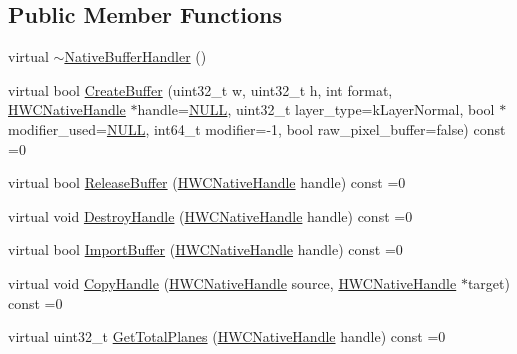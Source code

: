 \subsection*{Public Member Functions}
\begin{DoxyCompactItemize}
\item 
virtual \mbox{\hyperlink{classhwcomposer_1_1NativeBufferHandler_a646333d259ac8d876282312b1dcd599f}{$\sim$\+Native\+Buffer\+Handler}} ()
\item 
virtual bool \mbox{\hyperlink{classhwcomposer_1_1NativeBufferHandler_a7e58e3d81d3f56cbee34c963b4999fde}{Create\+Buffer}} (uint32\+\_\+t w, uint32\+\_\+t h, int format, \mbox{\hyperlink{alios_2platformdefines_8h_ac0a2eaf260f556d17fe489911f017bdf}{H\+W\+C\+Native\+Handle}} $\ast$handle=\mbox{\hyperlink{alios_2platformdefines_8h_a070d2ce7b6bb7e5c05602aa8c308d0c4}{N\+U\+LL}}, uint32\+\_\+t layer\+\_\+type=k\+Layer\+Normal, bool $\ast$modifier\+\_\+used=\mbox{\hyperlink{alios_2platformdefines_8h_a070d2ce7b6bb7e5c05602aa8c308d0c4}{N\+U\+LL}}, int64\+\_\+t modifier=-\/1, bool raw\+\_\+pixel\+\_\+buffer=false) const =0
\item 
virtual bool \mbox{\hyperlink{classhwcomposer_1_1NativeBufferHandler_abff911db92343545a36a0cc44a8d2eb8}{Release\+Buffer}} (\mbox{\hyperlink{alios_2platformdefines_8h_ac0a2eaf260f556d17fe489911f017bdf}{H\+W\+C\+Native\+Handle}} handle) const =0
\item 
virtual void \mbox{\hyperlink{classhwcomposer_1_1NativeBufferHandler_ab1e22d9737ca9f6c3e75d1b550e34ce9}{Destroy\+Handle}} (\mbox{\hyperlink{alios_2platformdefines_8h_ac0a2eaf260f556d17fe489911f017bdf}{H\+W\+C\+Native\+Handle}} handle) const =0
\item 
virtual bool \mbox{\hyperlink{classhwcomposer_1_1NativeBufferHandler_a5841be467d2aa11e8c4d7233596fda3c}{Import\+Buffer}} (\mbox{\hyperlink{alios_2platformdefines_8h_ac0a2eaf260f556d17fe489911f017bdf}{H\+W\+C\+Native\+Handle}} handle) const =0
\item 
virtual void \mbox{\hyperlink{classhwcomposer_1_1NativeBufferHandler_a96581fb8bd36e959c8da6b9f634ecd32}{Copy\+Handle}} (\mbox{\hyperlink{alios_2platformdefines_8h_ac0a2eaf260f556d17fe489911f017bdf}{H\+W\+C\+Native\+Handle}} source, \mbox{\hyperlink{alios_2platformdefines_8h_ac0a2eaf260f556d17fe489911f017bdf}{H\+W\+C\+Native\+Handle}} $\ast$target) const =0
\item 
virtual uint32\+\_\+t \mbox{\hyperlink{classhwcomposer_1_1NativeBufferHandler_a3b4115de8c13c53b6cd233f755f46dc9}{Get\+Total\+Planes}} (\mbox{\hyperlink{alios_2platformdefines_8h_ac0a2eaf260f556d17fe489911f017bdf}{H\+W\+C\+Native\+Handle}} handle) const =0

\end{DoxyCompactItemize}

